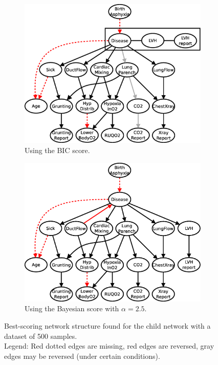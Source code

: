 \documentclass[english,cover]{fitthesis} %
\begin{document}
\begin{figure}[ht]
    \centering
    \begin{subfigure}[b]{0.45\linewidth}
        \hspace{-2.3cm}
        \includegraphics[scale=0.37]{fig/structure-learning-child-500-bic}
        \caption{Using the BIC score.}
        \label{fig:structure-learning-child-500-bic}
    \end{subfigure}
    \begin{subfigure}[b]{0.45\linewidth}
        \hspace{-0.5cm}
        \includegraphics[scale=0.37]{fig/structure-learning-child-500-bayes-2_5}
        \caption{Using the Bayesian score with $\alpha = 2.5$.}
        \label{fig:structure-learning-child-500-bayes-2_5}
    \end{subfigure}
    \caption{Best-scoring network structure found for the child network with a dataset of 500 samples.
    \\Legend: Red dotted edges are missing, red edges are reversed, gray edges may be reversed (under certain conditions).}
\end{figure}
\end{document}
